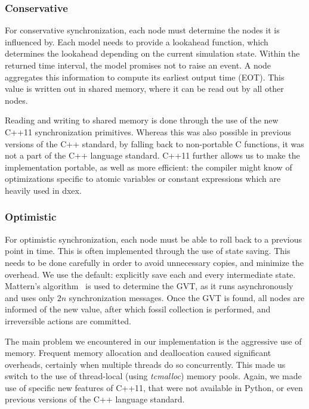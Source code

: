 \subsubsection{Conservative}
For conservative synchronization, each node must determine the nodes it is influenced by.
Each model needs to provide a lookahead function, which determines the lookahead depending on the current simulation state.
Within the returned time interval, the model promises not to raise an event.
A node aggregates this information to compute its earliest output time (EOT).
This value is written out in shared memory, where it can be read out by all other nodes.

Reading and writing to shared memory is done through the use of the new C++11 synchronization primitives.
Whereas this was also possible in previous versions of the C++ standard, by falling back to non-portable C functions, it was not a part of the C++ language standard.
C++11 further allows us to make the implementation portable, as well as more efficient: the compiler might know of optimizations specific to atomic variables or constant expressions which are heavily used in dxex.

\subsubsection{Optimistic}
For optimistic synchronization, each node must be able to roll back to a previous point in time.
This is often implemented through the use of state saving.
This needs to be done carefully in order to avoid unnecessary copies, and minimize the overhead.
We use the default: explicitly save each and every intermediate state.
Mattern's algorithm~\cite{mattern} is used to determine the GVT, as it runs asynchronously and uses only $2n$ synchronization messages.
Once the GVT is found, all nodes are informed of the new value, after which fossil collection is performed, and irreversible actions are committed.

The main problem we encountered in our implementation is the aggressive use of memory.
Frequent memory allocation and deallocation caused significant overheads, certainly when multiple threads do so concurrently.
This made us switch to the use of thread-local (using \textit{tcmalloc}) memory pools.
Again, we made use of specific new features of C++11, that were not available in Python, or even previous versions of the C++ language standard.

